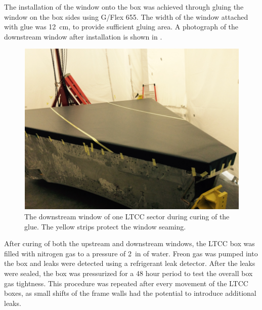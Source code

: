 The installation of the window onto the box was achieved through gluing the window on the box sides using
G/Flex 655. The width of the window
attached with glue was 12~cm, to provide sufficient gluing area.
A photograph of the downstream window after installation is shown in .

\begin{figure}
	\centering
	\includegraphics[width=1.0\columnwidth,keepaspectratio]{img/downstreamWindow.png}
	\caption{The downstream window of one LTCC sector during curing of the glue. The yellow strips protect the
          window seaming.}
	\label{fig:downstreamWindow}
\end{figure}

After curing of both the upstream and downstream windows, the LTCC box was filled with nitrogen gas to a pressure of
2~in of water.
Freon gas was pumped into the box and leaks were detected using a refrigerant leak detector. After the leaks were
sealed, the box was pressurized
for a 48 hour period to test the overall box gas tightness. This procedure was repeated after every movement of the LTCC boxes, as small
shifts of the frame walls had the potential to introduce additional leaks.

